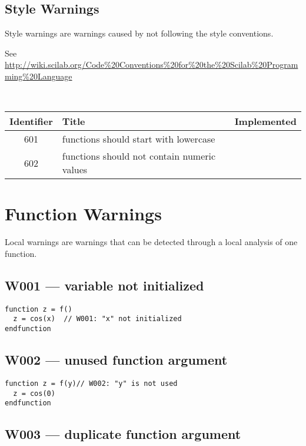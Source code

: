 \subsection{Style Warnings}



Style warnings are warnings caused by not following the style conventions.



See \url{http://wiki.scilab.org/Code%20Conventions%20for%20the%20Scilab%20Programming%20Language}



\noindent\\\begin{tabular}{|c|p{8cm}|c|} \hline
Identifier & Title & Implemented      \\ \hline
601 & functions should start with lowercase &  \\ \hline
602 & functions should not contain numeric values &  \\ \hline
\end{tabular}

\section{Function Warnings}



Local warnings are warnings that can be detected through a local analysis of
one function.



\subsection{W001 --- variable not initialized}


\begin{verbatim}
function z = f()
  z = cos(x)  // W001: "x" not initialized
endfunction
\end{verbatim}


\subsection{W002 --- unused function argument}


\begin{verbatim}
function z = f(y)// W002: "y" is not used
  z = cos(0)
endfunction
\end{verbatim}


\subsection{W003 --- duplicate function argument}





